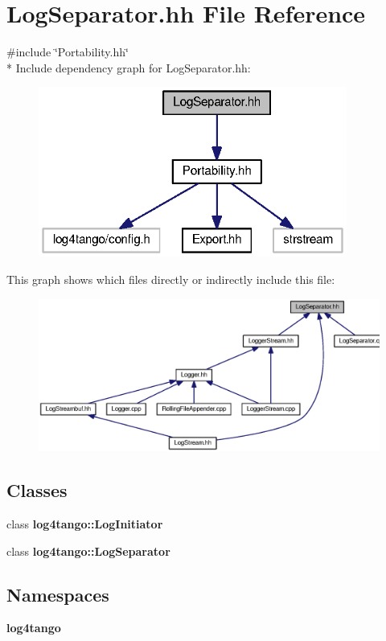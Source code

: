 \section{Log\-Separator.\-hh File Reference}
\label{LogSeparator_8hh}
{\ttfamily \#include \char`\"{}Portability.\-hh\char`\"{}}\\*
Include dependency graph for Log\-Separator.\-hh\-:
\nopagebreak
\begin{figure}[H]
\begin{center}
\leavevmode
\includegraphics[width=287pt]{d9/dfe/LogSeparator_8hh__incl}
\end{center}
\end{figure}
This graph shows which files directly or indirectly include this file\-:
\nopagebreak
\begin{figure}[H]
\begin{center}
\leavevmode
\includegraphics[width=350pt]{db/d17/LogSeparator_8hh__dep__incl}
\end{center}
\end{figure}
\subsection*{Classes}
\begin{DoxyCompactItemize}
\item 
class {\bf log4tango\-::\-Log\-Initiator}
\item 
class {\bf log4tango\-::\-Log\-Separator}
\end{DoxyCompactItemize}
\subsection*{Namespaces}
\begin{DoxyCompactItemize}
\item 
{\bf log4tango}
\end{DoxyCompactItemize}

